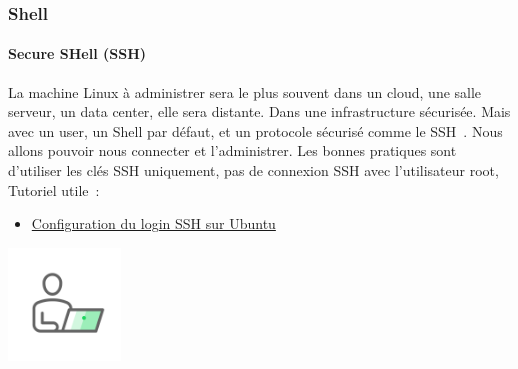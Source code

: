 \documentclass{beamer}
\begin{document}
    \begin{frame}
        \transdissolve
        \frametitle{Shell}
        \framesubtitle{Secure SHell (SSH)}
        La machine Linux à administrer sera le plus souvent dans un cloud, une salle serveur, un data center, elle sera distante.
        Dans une infrastructure sécurisée.
        \bigbreak
        Mais avec un user, un Shell par défaut, et un protocole sécurisé comme le SSH~.
        Nous allons pouvoir nous connecter et l'administrer.
        \bigbreak
        Les bonnes pratiques sont d'utiliser les clés SSH uniquement, pas de connexion SSH avec l'utilisateur root,
        Tutoriel utile~:
        \begin{itemize}
            \item \href{https://phoenixnap.com/kb/generate-setup-ssh-key-ubuntu}{Configuration du login SSH sur Ubuntu}
        \end{itemize}
        \bigbreak
        \centering
        \includegraphics[width=3cm]{image/guy-in-front-of-desktop}
    \end{frame}
\end{document}
